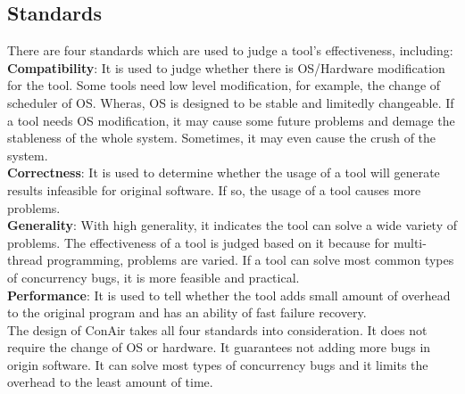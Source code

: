 \subsection{Standards}
There are four standards which are used to judge a tool's effectiveness, including:\\
\textbf{Compatibility}: It is used to judge whether there is OS/Hardware modification for the tool. Some tools need low level modification, for example, the change of scheduler of OS. Wheras, OS is designed to be stable and limitedly changeable. If a tool needs OS modification, it may cause some future problems and demage the stableness of the whole system. Sometimes, it may even cause the crush of the system.\\
\textbf{Correctness}: It is used to determine whether the usage of a tool will generate results infeasible for original software. If so, the usage of a tool causes more problems.\\
\textbf{Generality}: With high generality, it indicates the tool can solve a wide variety of problems. The effectiveness of a tool is judged based on it because for multi-thread programming, problems are varied. If a tool can solve most common types of concurrency bugs, it is more feasible and practical.\\
\textbf{Performance}: It is used to tell whether the tool adds small amount of overhead to the original program and has an ability of fast failure recovery. \\
The design of ConAir takes all four standards into consideration. It does not require the change of OS or hardware. It guarantees not adding more bugs in origin software. It can solve most types of concurrency bugs and it limits the overhead to the least amount of time. 
